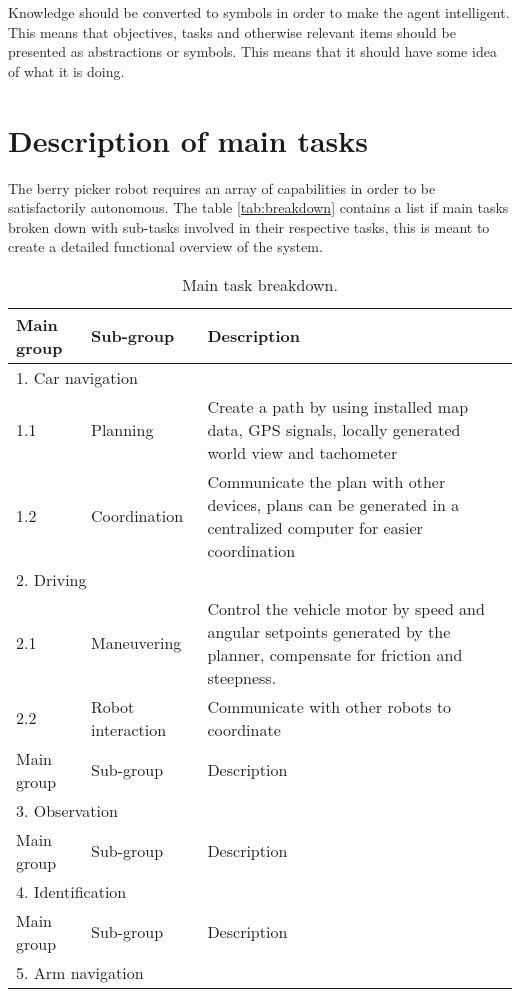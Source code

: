 \documentclass[%
oneside,    %
project,    %
nosummary   %
]{USN-MSc}
\begin{document}
Knowledge should be converted to symbols in order to make the agent intelligent. This means that objectives, tasks and otherwise relevant items should be presented as abstractions or symbols. This means that it should have some idea of what it is doing.

\section{Description of main tasks}

The berry picker robot requires an array of capabilities in order to be satisfactorily autonomous. The table \ref{tab:breakdown} contains a list if main tasks broken down with sub-tasks involved in their respective tasks, this is meant to create a detailed functional overview of the system.

\begin{table}[!ht]
  \caption{Main task breakdown.}
  \centering
  \begin{tabular}{| m{1.5cm} | m{3cm} | m{10cm} |}
    \hline
    Main group 
    & Sub-group 
    & Description  \\ \hline
    \multicolumn{3}{|l|}{1. Car navigation}  \\ \hline
    1.1        
    & Planning 
    & Create a path by using installed map data, GPS signals, locally generated world view and tachometer\\ \hline
    1.2       
    & Coordination
    & Communicate the plan with other devices, plans can be generated in a centralized computer for easier coordination\\ \hline
    \multicolumn{3}{|l|}{2. Driving}         \\ \hline
    2.1
    & Maneuvering
    & Control the vehicle motor by speed and angular setpoints generated by the planner, compensate for friction and steepness.  \\ \hline
    2.2 
    & Robot interaction
    & Communicate with other robots to coordinate   \\ \hline
    Main group 
    & Sub-group 
    & Description  \\ \hline
    \multicolumn{3}{|l|}{3. Observation}     \\ \hline
    Main group 
    & Sub-group 
    & Description  \\ \hline
    \multicolumn{3}{|l|}{4. Identification}  \\ \hline
    Main group 
    & Sub-group 
    & Description  \\ \hline
    \multicolumn{3}{|l|}{5. Arm navigation}  \\ \hline

\end{tabular}
\end{table}
\end{document}
